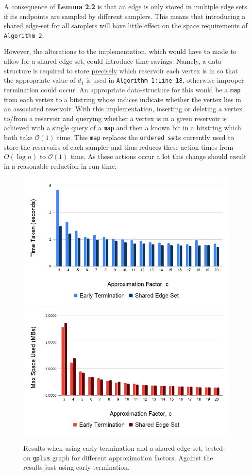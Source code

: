 \documentclass[11pt,twoside,a4paper]{report}
\begin{document}
\par A consequence of \textbf{Lemma 2.2} is that an edge is only stored in multiple edge sets if its endpoints are sampled by different samplers. %
This means that introducing a shared edge-set for all samplers will have little effect on the space requirements of \texttt{Algorithm 2}.
\par However, the alterations to the implementation, which would have to made to allow for a shared edge-set, could introduce time savings. Namely, a data-structure is required to store \underline{precisely} which reservoir each vertex is in so that the appropriate value of $d_1$ is used in \texttt{Algorithm 1:Line 18}, otherwise improper termination could occur. An appropriate data-structure for this would be a \texttt{map} from each vertex to a bitstring whose indices indicate whether the vertex lies in an associated reservoir. With this implementation, inserting or deleting a vertex to/from a reservoir and querying whether a vertex is in a given reservoir is achieved with a single query of a \texttt{map} and then a known bit in a bitstring which both take $\mathcal{O}(1)$ time. This \texttt{map} replaces the \texttt{ordered set}s currently used to store the reservoirs of each sampler and thus reduces these action times from $O(\log n)$ to $\mathcal{O}(1)$ time. As these actions occur a lot this change should result in a reasonable reduction in run-time. %

\begin{figure}[H]
	\label{Figure 4}
	\includegraphics[width=.5\textwidth]{img/gplusSharedEdgeSetTime.png}
	\includegraphics[width=.5\textwidth]{img/gplusSharedEdgeSetSpace.png}
	\caption{Results when using early termination and a shared edge set, tested on \texttt{gplus} graph for different approximation factors. Against the results just using early termination.}
\end{figure}
\end{document}
